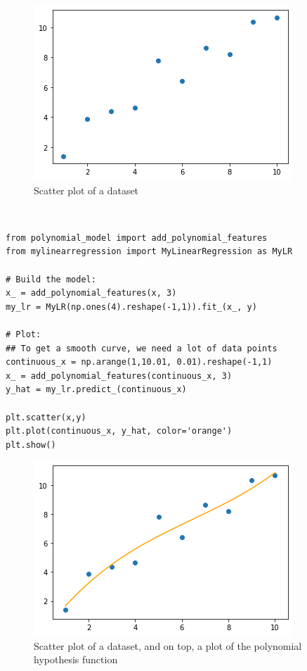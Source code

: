 \begin{figure}[!h]
    \centering
    \includegraphics[scale=0.6]{assets/ex12_data.png}
    \caption{Scatter plot of a dataset}
\end{figure}
\newpage
{}
\\
\begin{verbatim}
from polynomial_model import add_polynomial_features
from mylinearregression import MyLinearRegression as MyLR

# Build the model:
x_ = add_polynomial_features(x, 3)
my_lr = MyLR(np.ones(4).reshape(-1,1)).fit_(x_, y)

# Plot:
## To get a smooth curve, we need a lot of data points
continuous_x = np.arange(1,10.01, 0.01).reshape(-1,1)
x_ = add_polynomial_features(continuous_x, 3)
y_hat = my_lr.predict_(continuous_x)

plt.scatter(x,y)
plt.plot(continuous_x, y_hat, color='orange')
plt.show()
\end{verbatim}

\begin{figure}[!h]
    \centering
    \includegraphics[scale=0.6]{assets/ex12_plot.png}
    \caption{Scatter plot of a dataset, and on top, a plot of the polynomial hypothesis function}
\end{figure}
